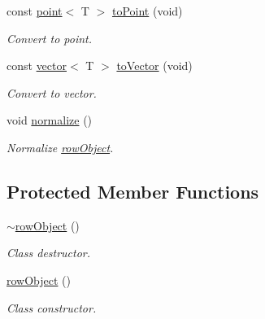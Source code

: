 \begin{DoxyCompactItemize}
\mbox{\label{classddd_1_1row_object_a760b84053c4b923e060dae45a9284856}} 
const \hyperlink{classddd_1_1point}{point}$<$ T $>$ \hyperlink{classddd_1_1row_object_a760b84053c4b923e060dae45a9284856}{to\+Point} (void)
\begin{DoxyCompactList}\small\item\em Convert to point. \end{DoxyCompactList}\item 
\mbox{\label{classddd_1_1row_object_a59fbb28dfc75528f20a0032f6a7bdccd}} 
const \hyperlink{classddd_1_1vector}{vector}$<$ T $>$ \hyperlink{classddd_1_1row_object_a59fbb28dfc75528f20a0032f6a7bdccd}{to\+Vector} (void)
\begin{DoxyCompactList}\small\item\em Convert to vector. \end{DoxyCompactList}\item 
\mbox{\label{classddd_1_1row_object_ad567bf2ca914b05a544b73bcec70cc57}} 
void \hyperlink{classddd_1_1row_object_ad567bf2ca914b05a544b73bcec70cc57}{normalize} ()
\begin{DoxyCompactList}\small\item\em Normalize \hyperlink{classddd_1_1row_object}{row\+Object}. \end{DoxyCompactList}\end{DoxyCompactItemize}
\subsection*{Protected Member Functions}
\begin{DoxyCompactItemize}
\item 
\mbox{\label{classddd_1_1row_object_a7fcccccb1222a93ccaacca70e8faa9d3}} 
\hyperlink{classddd_1_1row_object_a7fcccccb1222a93ccaacca70e8faa9d3}{$\sim$row\+Object} ()
\begin{DoxyCompactList}\small\item\em Class destructor. \end{DoxyCompactList}\item 
\mbox{\label{classddd_1_1row_object_ae5fe7e1a78443beb05189475fb4af63e}} 
\hyperlink{classddd_1_1row_object_ae5fe7e1a78443beb05189475fb4af63e}{row\+Object} ()
\begin{DoxyCompactList}\small\item\em Class constructor. \end{DoxyCompactList}\end{DoxyCompactItemize}



